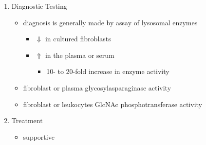 \documentclass{scrartcl}
\begin{document}
\begin{enumerate}
\item Diagnostic Testing
\label{sec:org691f560}
\begin{itemize}
\item diagnosis is generally made by assay of lysosomal enzymes
\begin{itemize}
\item \(\Downarrow\) in cultured fibroblasts
\item \(\Uparrow\) in the plasma or serum
\begin{itemize}
\item 10- to 20-fold increase in enzyme activity
\end{itemize}
\end{itemize}
\item fibroblast or plasma glycosylasparaginase activity
\item fibroblast or leukocytes GlcNAc phosphotransferase activity
\end{itemize}

\item Treatment
\label{sec:orgce5cf04}
\begin{itemize}
\item supportive
\end{itemize}
\end{enumerate}
\end{document}

